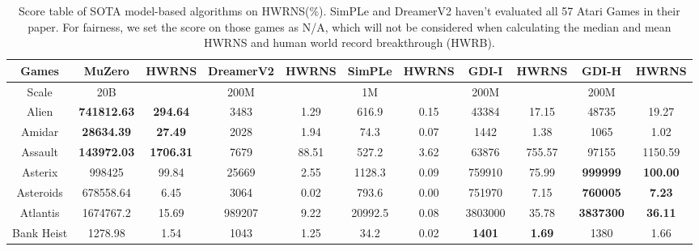 \documentclass[nohyperref]{article}
\newcommand{\best}[1]{\textbf{#1}}
\theoremstyle{plain}
\begin{document}
\begin{table}[!hb]
\footnotesize
\begin{center}
\caption{Score table of SOTA model-based algorithms on HWRNS(\%). SimPLe \citep{modelbasedatari} and DreamerV2\citep{dreamerv2} haven't evaluated all 57 Atari Games in their paper. For fairness, we set the score on those games as N/A, which will not be considered when calculating the median and mean HWRNS and human world record breakthrough (HWRB). }
\label{Tab:Score table of SOTA model-based algorithms on HWRNS.}
\setlength{\tabcolsep}{1.0pt}
\begin{tabular}{| c |c c| c c| c c| c c| c c| }
\hline
 Games              & MuZero         & HWRNS      & DreamerV2 & HWRNS   & SimPLe             & HWRNS          & GDI-I     & HWRNS & GDI-H & HWRNS \\
\hline
Scale               & 20B            &              & 200M      &            & 1M               &                  & 200M     & &    200M   &\\
\hline
 Alien              & \textbf{741812.63}      & \textbf{294.64  }     &3483       & 1.29     &616.9     & 0.15    & 43384       &  17.15            &48735             &19.27       \\
 Amidar             & \textbf{28634.39 }      & \textbf{27.49   }  &2028       & 1.94     &74.3      & 0.07    & 1442        &  1.38                &1065              &1.02     \\
 Assault            & \textbf{143972.03}      & \textbf{1706.31 }     &7679       & 88.51       &527.2     & 3.62       & 63876       &  755.57     &97155             &1150.59    \\
 Asterix            & 998425         & 99.84        &25669      & 2.55     &1128.3    & 0.09       & 759910      &  75.99         &\textbf{999999}            &\textbf{100.00} \\
 Asteroids          & 678558.64               & 6.45        &3064                & 0.02    &793.6              & 0.00    &751970         & 7.15   &\textbf{760005}            &\textbf{7.23}  \\
 Atlantis           & 1674767.2               & 15.69           &989207              & 9.22       &20992.5            & 0.08       &3803000        & 35.78  &\textbf{3837300}           &\textbf{36.11}  \\
 Bank Heist         & 1278.98                 & 1.54        &1043                & 1.25    &34.2               & 0.02    &\best{1401}           & \best{1.69  }  &1380              &1.66 \\

\end{tabular}
\end{center}
\end{table}
\end{document}
